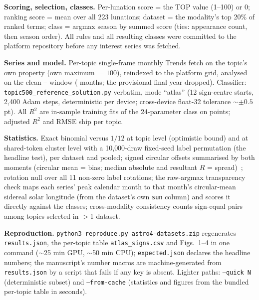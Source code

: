 \documentclass[11pt]{artaquest}
\begin{document}
\textbf{Scoring, selection, classes.} Per-lunation score = the TOP value (1--100) or 0; ranking score = mean over all 223 lunations; dataset = the modality's top 20\% of ranked terms; class = argmax season by summed score (ties: appearance count, then season order). All rules and all resulting classes were committed to the platform repository before any interest series was fetched.

\textbf{Series and model.} Per-topic single-frame monthly Trends fetch on the topic's own property (own maximum $=100$), reindexed to the platform grid, analysed on the clean \winStart{}--\winEnd{} window (\nMonths{} months; the provisional final year dropped). Classifier: \texttt{topic500\_reference\_solution.py} verbatim, mode ``atlas'' (12 sign-centre starts, 2{,}400 Adam steps, deterministic per device; cross-device float-32 tolerance $\sim\pm0.5$ pt). All $R^2$ are in-sample training fits of the 24-parameter class on \nMonths{} points; adjusted $R^2$ and RMSE ship per topic.

\textbf{Statistics.} Exact binomial versus $1/12$ at topic level (optimistic bound) and at shared-token cluster level with a 10{,}000-draw fixed-seed label permutation (the headline test), per dataset and pooled; signed circular offsets summarised by both moments (circular mean = bias; median absolute and resultant $R$ = spread)~\citep{fisher1993}; rotation null over all 11 non-zero label rotations; the raw-argmax transparency check maps each series' peak calendar month to that month's circular-mean sidereal solar longitude (from the dataset's own \texttt{sun} column) and scores it directly against the classes; cross-modality consistency counts sign-equal pairs among topics selected in $>$1 dataset.

{\sloppy\textbf{Reproduction.} \texttt{python3 reproduce.py astro4-datasets.zip} regenerates \texttt{results.json}, the per-topic table \texttt{atlas\_signs.csv} and Figs.~1--4 in one command ($\sim$25 min GPU, $\sim$50 min CPU); \texttt{expected.json} declares the headline numbers; the manuscript's number macros are machine-generated from \texttt{results.json} by a script that fails if any key is absent. Lighter paths: \texttt{--quick N} (deterministic subset) and \texttt{--from-cache} (statistics and figures from the bundled per-topic table in seconds).\par}

\declarations



\end{document}
